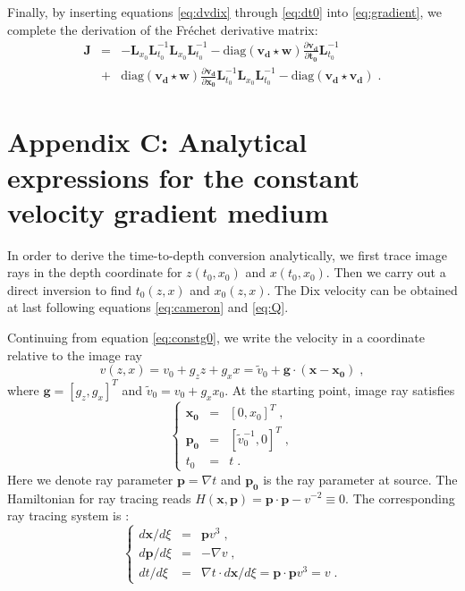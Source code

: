 Finally, by inserting equations \ref{eq:dvdix} through \ref{eq:dt0} into \ref{eq:gradient}, we complete the 
derivation of the Fr\'{e}chet derivative matrix:
\begin{eqnarray}
\label{eq:final}
\mathbf{J} & = & - \mathbf{L}_{x_0} \mathbf{L}_{t_0}^{-1} \mathbf{L}_{x_0} \mathbf{L}_{t_0}^{-1} 
- \mbox{diag}(\mathbf{v_d} \star \mathbf{w}) \frac{\partial \mathbf{v_d}}{\partial \mathbf{t_0}} \mathbf{L}_{t_0}^{-1} \nonumber \\
& + & \mbox{diag}(\mathbf{v_d} \star \mathbf{w}) \frac{\partial \mathbf{v_d}}{\partial \mathbf{x_0}} 
\mathbf{L}_{t_0}^{-1} \mathbf{L}_{x_0} \mathbf{L}_{t_0}^{-1} - \mbox{diag}(\mathbf{v_d} \star \mathbf{v_d})\;.
\end{eqnarray}

\appendix
\section{Appendix C: Analytical expressions for the constant velocity gradient medium}
In order to derive the time-to-depth conversion analytically, we first trace image rays in the depth 
coordinate for $z (t_0,x_0)$ and $x (t_0,x_0)$. Then we carry out a direct inversion to find $t_0 (z,x)$ and 
$x_0 (z,x)$. The Dix velocity can be obtained at last following equations \ref{eq:cameron} and \ref{eq:Q}.

Continuing from equation \ref{eq:constg0}, we write the velocity in a coordinate relative to the image ray 
\begin{equation}
\label{eq:constg}
v (z,x) = v_0 + g_z z + g_x x = \tilde{v}_0 + \mathbf{g} \cdot (\mathbf{x} - \mathbf{x_0})\;,
\end{equation}
where $\mathbf{g} = [g_z,g_x]^T$ and $\tilde{v}_0 = v_0 + g_x x_0$. At the starting point, image ray satisfies
\begin{equation}
\label{eq:viray}
\left\{ \begin{array}{lcl}
\mathbf{x_0} & = & [0, x_0]^T\;, \\
\mathbf{p_0} & = & [\tilde{v}_0^{-1}, 0]^T\;, \\
t_0 & = & t\;.
\end{array} \right.
\end{equation}
Here we denote ray parameter $\mathbf{p} = \nabla t$ and $\mathbf{p_0}$ is the ray parameter at source. The 
Hamiltonian for ray tracing reads $H (\mathbf{x},\mathbf{p}) = \mathbf{p} \cdot \mathbf{p} - v^{-2} \equiv 0$. 
The corresponding ray tracing system is \cite[]{cerveny}:
\begin{equation}
\label{eq:vraysys}
\left\{ \begin{array}{lcl}
d \mathbf{x} / d \xi & = & \mathbf{p} v^3\;, \\
d \mathbf{p} / d \xi & = & -\nabla v\;, \\
d t / d \xi & = & \nabla t \cdot d \mathbf{x} / d \xi = \mathbf{p} \cdot \mathbf{p} v^3 = v\;.
\end{array} \right.
\end{equation}

